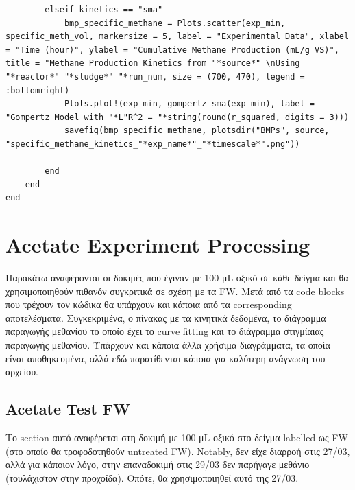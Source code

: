 \documentclass[11pt]{article}
\begin{document}
\begin{verbatim}
        elseif kinetics == "sma"
            bmp_specific_methane = Plots.scatter(exp_min, specific_meth_vol, markersize = 5, label = "Experimental Data", xlabel = "Time (hour)", ylabel = "Cumulative Methane Production (mL/g VS)", title = "Methane Production Kinetics from "*source*" \nUsing "*reactor*" "*sludge*" "*run_num, size = (700, 470), legend = :bottomright)
            Plots.plot!(exp_min, gompertz_sma(exp_min), label = "Gompertz Model with "*L"R^2 = "*string(round(r_squared, digits = 3)))
            savefig(bmp_specific_methane, plotsdir("BMPs", source, "specific_methane_kinetics_"*exp_name*"_"*timescale*".png"))

        end
    end
end

\end{verbatim}

\section{Acetate Experiment Processing}
\label{sec:org08dc9c1}
Παρακάτω αναφέρονται οι δοκιμές που έγιναν με 100 μL οξικό σε κάθε δείγμα και θα χρησιμοποιηθούν πιθανόν συγκριτικά σε σχέση με τα FW. Μετά από τα code blocks που τρέχουν τον κώδικα θα υπάρχουν και κάποια από τα corresponding αποτελέσματα. Συγκεκριμένα, ο πίνακας με τα κινητικά δεδομένα, το διάγραμμα παραγωγής μεθανίου το οποίο έχει το curve fitting και το διάγραμμα στιγμίαιας παραγωγής μεθανίου. Υπάρχουν και κάποια άλλα χρήσιμα διαγράμματα, τα οποία είναι αποθηκευμένα, αλλά εδώ παρατίθενται κάποια για καλύτερη ανάγνωση του αρχείου.

\subsection{Acetate Test FW}
\label{sec:orgb4090bf}
Το section αυτό αναφέρεται στη δοκιμή με 100 μL οξικό στο δείγμα labelled ως FW (στο οποίο θα τροφοδοτηθούν untreated FW). Notably, δεν είχε διαρροή στις 27/03, αλλά για κάποιον λόγο, στην επαναδοκιμή στις 29/03 δεν παρήγαγε μεθάνιο (τουλάχιστον στην προχοίδα). Οπότε, θα χρησιμοποιηθεί αυτό της 27/03.
\end{document}

